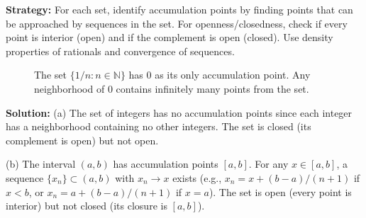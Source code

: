 \noindent\textbf{Strategy:} For each set, identify accumulation points by finding points that can be approached by sequences in the set. For openness/closedness, check if every point is interior (open) and if the complement is open (closed). Use density properties of rationals and convergence of sequences.

\begin{figure}[h]
\centering
{}
\caption{The set $\{1/n : n \in \mathbb{N}\}$ has 0 as its only accumulation point. Any neighborhood of 0 contains infinitely many points from the set.}
\end{figure}

\bigskip\noindent\textbf{Solution:} 
(a) The set of integers has no accumulation points since each integer has a neighborhood containing no other integers. The set is closed (its complement is open) but not open.

(b) The interval $(a,b)$ has accumulation points $[a,b]$. For any $x \in [a,b]$, a sequence $\{x_n\} \subset (a,b)$ with $x_n \to x$ exists (e.g., $x_n = x + (b-a)/(n+1)$ if $x < b$, or $x_n = a + (b-a)/(n+1)$ if $x = a$). The set is open (every point is interior) but not closed (its closure is $[a,b]$).

